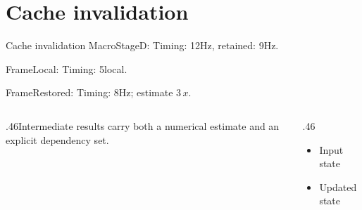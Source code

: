 \documentclass[9pt,aspectratio=43]{beamer}
\newcommand{\fuzzlayerA}[1]{\textrm{#1}}
\newcommand{\fuzzterm}[1]{\fuzzlayerA{#1}}
\newcommand{\fuzzpair}[2]{\fuzzterm{#1}: #2}
\newcommand{\fuzzunit}{Hz}
\let\fuzzoriginalunit\fuzzunit
\newcommand{\fuzzcoefficient}{3}
\newcommand{\fuzzscale}[2][\fuzzcoefficient]{#1\,#2}
\begin{document}
\section{Cache invalidation}
\begin{frame}[t]{Cache invalidation}
\fuzzpair{MacroStageD}{Timing: 12\fuzzunit, retained: 9\fuzzoriginalunit.}\par
{\renewcommand{\fuzzunit}{local}\fuzzpair{FrameLocal}{Timing: 5\fuzzunit.}\par}
\fuzzpair{FrameRestored}{Timing: 8\fuzzunit; estimate $\fuzzscale{x}$.}\par
\begin{columns}[T]\begin{column}{.46\textwidth}Intermediate results carry both a numerical estimate and an explicit dependency set.\end{column}\begin{column}{.46\textwidth}\begin{itemize}\item Input state\item Updated state\end{itemize}\end{column}\end{columns}
\end{frame}
\end{document}
